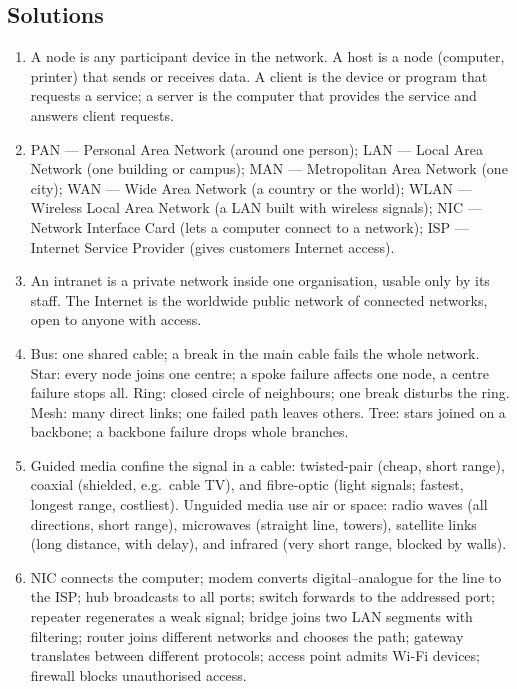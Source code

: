 \documentclass[11pt]{article}
\begin{document}
\subsection*{Solutions}
\begingroup\small
\begin{enumerate}[label=\arabic*.]
  \item A node is any participant device in the network. A host is a node
    (computer, printer) that sends or receives data. A client is the device
    or program that requests a service; a server is the computer that
    provides the service and answers client requests.
  \item PAN --- Personal Area Network (around one person); LAN --- Local Area
    Network (one building or campus); MAN --- Metropolitan Area Network (one
    city); WAN --- Wide Area Network (a country or the world); WLAN ---
    Wireless Local Area Network (a LAN built with wireless signals); NIC ---
    Network Interface Card (lets a computer connect to a network); ISP ---
    Internet Service Provider (gives customers Internet access).
  \item An intranet is a private network inside one organisation, usable only
    by its staff. The Internet is the worldwide public network of connected
    networks, open to anyone with access.
  \item Bus: one shared cable; a break in the main cable fails the whole
    network. Star: every node joins one centre; a spoke failure affects one
    node, a centre failure stops all. Ring: closed circle of neighbours; one
    break disturbs the ring. Mesh: many direct links; one failed path leaves
    others. Tree: stars joined on a backbone; a backbone failure drops whole
    branches.
  \item Guided media confine the signal in a cable: twisted-pair (cheap,
    short range), coaxial (shielded, e.g.\ cable TV), and fibre-optic
    (light signals; fastest, longest range, costliest). Unguided media use
    air or space: radio waves (all directions, short range), microwaves
    (straight line, towers), satellite links (long distance, with delay),
    and infrared (very short range, blocked by walls).
  \item NIC connects the computer; modem converts digital--analogue for the
    line to the ISP; hub broadcasts to all ports; switch forwards to the
    addressed port; repeater regenerates a weak signal; bridge joins two LAN
    segments with filtering; router joins different networks and chooses the
    path; gateway translates between different protocols; access point admits
    Wi-Fi devices; firewall blocks unauthorised access.
\end{enumerate}
\endgroup
\end{document}
